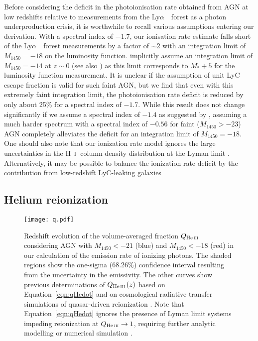 \documentclass[fleqn,usenatbib]{mnras}
\def\lya{Ly$\alpha$~}
\def\HI{\hbox{H~$\scriptstyle\rm I$}}
\begin{document}
Before considering the deficit in the photoionisation rate obtained
from AGN at low redshifts relative to measurements from the
\lya\ forest as a photon underproduction crisis, it is worthwhile to
recall various assumptions entering our derivation.  With a spectral
index of $-1.7$, our ionisation rate estimate falls short of the
\lya\ forest measurements by a factor of $\sim 2$ with an integration
limit of $M_{1450}=-18$ on the luminosity function.
\citet{2015ApJ...813L...8M} implicitly assume an integration limit of
$M_{1450}=-14$ at $z\sim 0$ (see also \citealt{2015MNRAS.451L..30K,
  2018arXiv180104931P}) as this limit corresponds to $M_*+5$ for the
\citet{2009A&A...507..781S} luminosity function measurement.  It is
unclear if the assumption of unit LyC escape fraction is valid for
such faint AGN, but we find that even with this extremely faint
integration limit, the photoionisation rate deficit is reduced by only
about 25\% for a spectral index of $-1.7$.  While this result does not
change significantly if we assume a spectral index of $-1.4$ as
suggested by \citet{2014ApJ...794...75S}, assuming a much harder
spectrum with a spectral index of $-0.56$ \citep{2004ApJ...615..135S}
for faint ($M_{1450}>-23$) AGN completely alleviates the deficit for
an integration limit of $M_{1450}=-18$.  One should also note that our
ionization rate model ignores the large uncertainties in the
\HI\ column density distribution at the Lyman limit
\citep{2011ApJ...736...42R, 2017ApJ...849..106S, 2017MNRAS.466..838G}.  Alternatively, it
may be possible to balance the ionization rate deficit by the
contribution from low-redshift LyC-leaking galaxies
\citep{2016Natur.529..178I, 2018MNRAS.474.4514I, 2018MNRAS.478.4851I}

\subsection{Helium reionization}

\begin{figure}
  \begin{center}
    \texttt{[image: q.pdf]}
  \end{center}
  \caption{ Redshift evolution of the volume-averaged 
    fraction $Q_\ion{He}{iii}$ considering AGN with $M_{1450}<-21$
    (blue) and $M_{1450}<-18$ (red) in our calculation of the emission
    rate of ionizing photons.  The shaded regions show the one-sigma
    (68.26\%) confidence interval resulting from the uncertainty in
    the emissivity.  The other curves show previous determinations of
    $Q_\ion{He}{iii}\left(z\right)$ based on
    Equation~\eqref{eqn:qHedot} \citep{2012ApJ...746..125H,
      2015ApJ...813L...8M, 2016ApJ...828...90L, 2018arXiv180104931P}
    and on cosmological radiative transfer simulations of
    quasar-driven  reionization
    \citep{2009ApJ...694..842M, 2014MNRAS.445.4186C}.  Note that
    Equation~\eqref{eqn:qHedot} ignores the presence of 
    Lyman limit systems impeding reionization at
    $Q_\ion{He}{iii}\rightarrow 1$, requiring further analytic
    modelling \citep{2017ApJ...851...50M} or numerical simulation
    \citep{2018arXiv180104931P}.
  \label{fig:qhe}}  
\end{figure}
\end{document}

